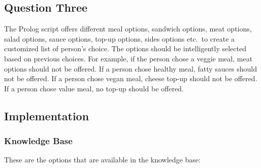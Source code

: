 \documentclass{article}
\begin{document}


\subsection*{Question Three}

The Prolog script offers different meal options, sandwich options, meat options, salad options, sauce options, top-up options, sides options etc.\ to create a customized list of person's choice. The  options  should  be  intelligently  selected  based  on  previous  choices.  For  example,  if  the person chose a veggie meal, meat options should not be offered. If a person chose healthy meal, fatty sauces should not be offered. If a person chose vegan meal, cheese top-up should not be offered. If a person chose value meal, no top-up should be offered.

\subsection*{Implementation}

\subsubsection*{Knowledge Base}

These are the options that are available in the knowledge base:
\end{document}
